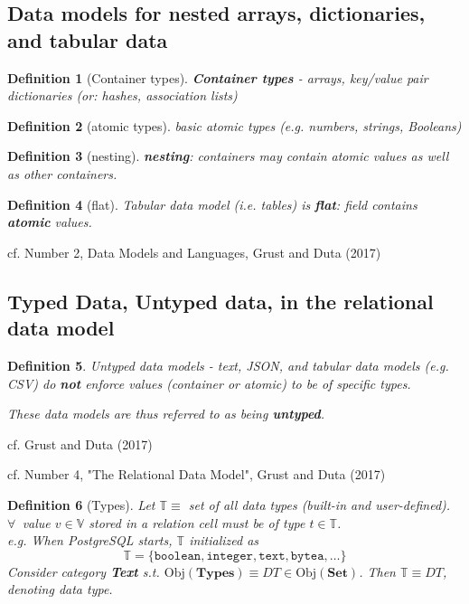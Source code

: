 \documentclass[10pt]{amsart}
\newtheorem{definition}{Definition}
\begin{document}
\begin{multicols*}{2}
\subsection{Data models for nested arrays, dictionaries, and tabular data}

\begin{definition}[Container types]
	\textbf{Container types} - arrays, key/value pair dictionaries (or: hashes, association lists)
\end{definition}

\begin{definition}[atomic types]
	basic atomic types (e.g. numbers, strings, Booleans)
\end{definition}

\begin{definition}[nesting]
	\textbf{nesting}: containers may contain atomic values as well as other containers.
\end{definition}

\begin{definition}[flat]
	Tabular data model (i.e. tables) is \textbf{flat}: field contains \textbf{atomic} values.
\end{definition}
cf. Number 2, Data Models and Languages, Grust and Duta (2017) \cite{GrDu2017}


\subsection{Typed Data, Untyped data, in the relational data model}

\begin{definition}
	Untyped data models - text, JSON, and tabular data models (e.g. CSV) do \textbf{not} enforce values (container or atomic) to be of specific types. 
	
	These data models are thus referred to as being \textbf{untyped}.
\end{definition}
cf. Grust and Duta (2017) \cite{GrDu2017}


cf. Number 4, "The Relational Data Model", Grust and Duta (2017) \cite{GrDu2017}

\begin{definition}[Types]
Let $\mathbb{T} \equiv $ set of all data types (built-in and user-defined).  \\
$\forall \, $ value $v\in  \mathbb{V}$ stored in a relation cell must be of type $t\in \mathbb{T}$. \\
e.g. When PostgreSQL starts, $\mathbb{T}$ initialized as 
\begin{equation}
 \mathbb{T} = \lbrace \texttt{boolean}, \texttt{integer}, \texttt{text}, \texttt{bytea}, \dots \rbrace 
\end{equation}
Consider category \textbf{Text} s.t. $\text{Obj}(\mathbf{Types}) \equiv DT \in \text{Obj}(\textbf{Set})$. Then $\mathbb{T} \equiv DT$, denoting \emph{data type}.
\end{definition}


\end{multicols*}
\end{document}

